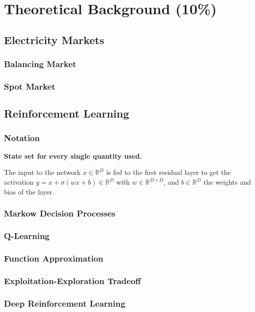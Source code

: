 \documentclass[12pt, article]{article}
\begin{document}
\section{Theoretical Background (10\%)}
\label{sec:org0f53be5}
\subsection{Electricity Markets}
\label{sec:org3f757aa}
\subsubsection{Balancing Market}
\label{sec:org5b71c33}
\subsubsection{Spot Market}
\label{sec:org9445373}
\subsection{Reinforcement Learning}
\label{sec:orgfeebb4e}
\subsubsection{Notation}
\label{sec:org677782e}
\textbf{State set for every single quantity used.}


The input to the network \(x \in \mathbb{R}^D\) is fed to the first residual layer to get the activation \(y = x + \sigma(w x + b) \in \mathbb{R}^D\) with \(w \in \mathbb{R}^{D \times D}\), and \(b \in \mathbb{R}^D\) the weights and bias of the layer.
\subsubsection{Markow Decision Processes}
\label{sec:org164edd6}
\subsubsection{Q-Learning}
\label{sec:orge643acd}
\subsubsection{Function Approximation}
\label{sec:org32066b6}
\subsubsection{Exploitation-Exploration Tradeoff}
\label{sec:org017ec87}
\subsubsection{Deep Reinforcement Learning}
\label{sec:orgf7098cd}
\end{document}
